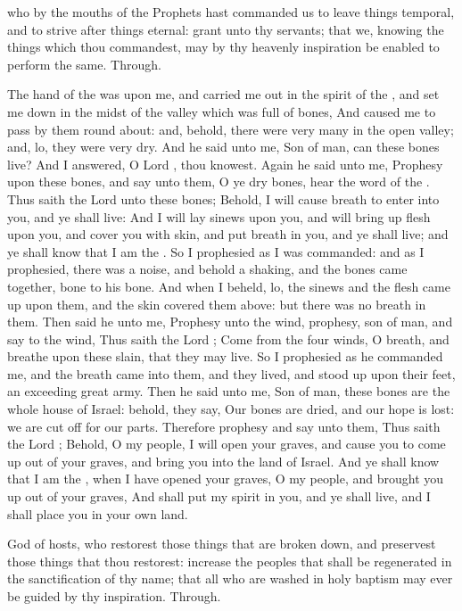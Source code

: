 {} who by the mouths of the Prophets hast commanded us to leave things temporal, and to strive after things eternal: grant unto thy servants; that we, knowing the things which thou commandest, may by thy heavenly inspiration be enabled to perform the same. Through.

 The hand of the  was upon me, and carried me out in the spirit of the , and set me down in the midst of the valley which was full of bones, And caused me to pass by them round about: and, behold, there were very many in the open valley; and, lo, they were very dry. And he said unto me, Son of man, can these bones live? And I answered, O Lord , thou knowest. Again he said unto me, Prophesy upon these bones, and say unto them, O ye dry bones, hear the word of the . Thus saith the Lord  unto these bones; Behold, I will cause breath to enter into you, and ye shall live: And I will lay sinews upon you, and will bring up flesh upon you, and cover you with skin, and put breath in you, and ye shall live; and ye shall know that I am the . So I prophesied as I was commanded: and as I prophesied, there was a noise, and behold a shaking, and the bones came together, bone to his bone. And when I beheld, lo, the sinews and the flesh came up upon them, and the skin covered them above: but there was no breath in them. Then said he unto me, Prophesy unto the wind, prophesy, son of man, and say to the wind, Thus saith the Lord ; Come from the four winds, O breath, and breathe upon these slain, that they may live. So I prophesied as he commanded me, and the breath came into them, and they lived, and stood up upon their feet, an exceeding great army. Then he said unto me, Son of man, these bones are the whole house of Israel: behold, they say, Our bones are dried, and our hope is lost: we are cut off for our parts. Therefore prophesy and say unto them, Thus saith the Lord ; Behold, O my people, I will open your graves, and cause you to come up out of your graves, and bring you into the land of Israel. And ye shall know that I am the , when I have opened your graves, O my people, and brought you up out of your graves, And shall put my spirit in you, and ye shall live, and I shall place you in your own land.

{} God of hosts, who restorest those things that are broken down, and preservest those things that thou restorest: increase the peoples that shall be regenerated in the sanctification of thy name; that all who are washed in holy baptism may ever be guided by thy inspiration. Through.

